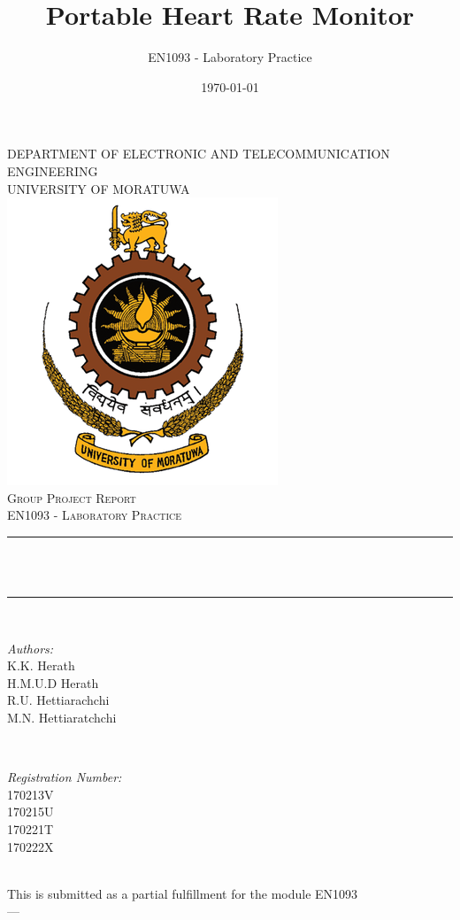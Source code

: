 \documentclass[12pt]{article}
\title{Portable Heart Rate Monitor}	%
\author{EN1093 - Laboratory Practice}	%
\date{\today}						%
\makeatletter
\let\thetitle\@title
\let\thedate\@date
\makeatother
\begin{document}

\begin{titlepage}
	
	\centering
	
	\textsc{\small DEPARTMENT OF ELECTRONIC AND TELECOMMUNICATION ENGINEERING\\}
	\textsc{\small UNIVERSITY OF MORATUWA}\\[1.0 cm]
    \vspace*{0.5 cm}
    \includegraphics[scale = 0.35]{uom.png}\\[1.5 cm]	%
    \textsc{\LARGE Group Project Report}\\[0.7 cm]	%
	\textsc{\Large EN1093 - Laboratory Practice}\\[0.5 cm]			%

	\rule{\linewidth}{0.2 mm} \\[0.4 cm]
	{ \huge \bfseries \thetitle}\\
	\rule{\linewidth}{0.2 mm} \\[1.5 cm]
	
	\begin{minipage}{0.4\textwidth}
		\begin{flushleft} \large
			\emph{Authors:}\\
			K.K. Herath\\
			H.M.U.D Herath\\
			R.U. Hettiarachchi\\
			M.N. Hettiaratchchi
			\end{flushleft}
			\end{minipage}~
			\begin{minipage}{0.4\textwidth}
			\begin{flushright} \large
			\emph{Registration Number:} \\
			170213V\\
			170215U\\
			170221T\\
			170222X
		\end{flushright}
	\end{minipage}\\[2 cm]
	 This is submitted as a partial fulfillment for the module EN1093\\[0.2 cm]
	 ---\\
	{\large \thedate}\\[2 cm]
	

\end{titlepage}
\end{document}
